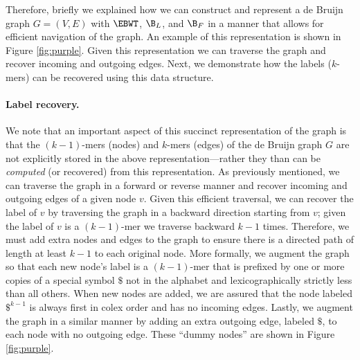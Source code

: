 Therefore, briefly we explained how we can construct and represent a de Bruijn graph $G = (V, E)$ with $\EBWT$, $\B_L$,  and $\B_F$ in a manner that allows for efficient navigation of the graph. An example of this representation is shown in Figure \ref{fig:purple}. Given this representation we can traverse the graph and recover incoming and outgoing edges.   Next, we demonstrate how the labels ($k$-mers) can be recovered using this data structure.


\paragraph*{Label recovery.}  We note that an important aspect of this succinct representation of the graph is that the $(k - 1)$-mers (nodes) and $k$-mers (edges) of the de Bruijn graph $G$ are not explicitly stored in the above representation---rather they than can be {\em computed} (or recovered) from this representation.    As previously mentioned, we can traverse the graph in a forward or reverse manner and recover incoming and outgoing edges of a given node $v$.  Given this efficient traversal, we can recover the label of $v$ by traversing the graph in a backward direction starting from $v$;  given the label of $v$ is a $(k - 1)$-mer we traverse backward $k - 1$ times.  Therefore, we must add extra nodes and edges to the graph to ensure there is a directed path of length at least \(k - 1\) to each original node.  More formally, we augment the graph so that each new node's label is a \((k - 1)\)-mer that is prefixed by one or more copies of a special symbol $\$$ not in the alphabet and lexicographically strictly less than all others.  When new nodes are added, we are assured that the node labeled $\$^{k - 1}$ is always first in colex order and has no incoming edges.  Lastly, we augment the graph in a similar manner by adding an extra outgoing edge, labeled $\$$, to each node with no outgoing edge.   These ``dummy nodes'' are shown in Figure \ref{fig:purple}.


